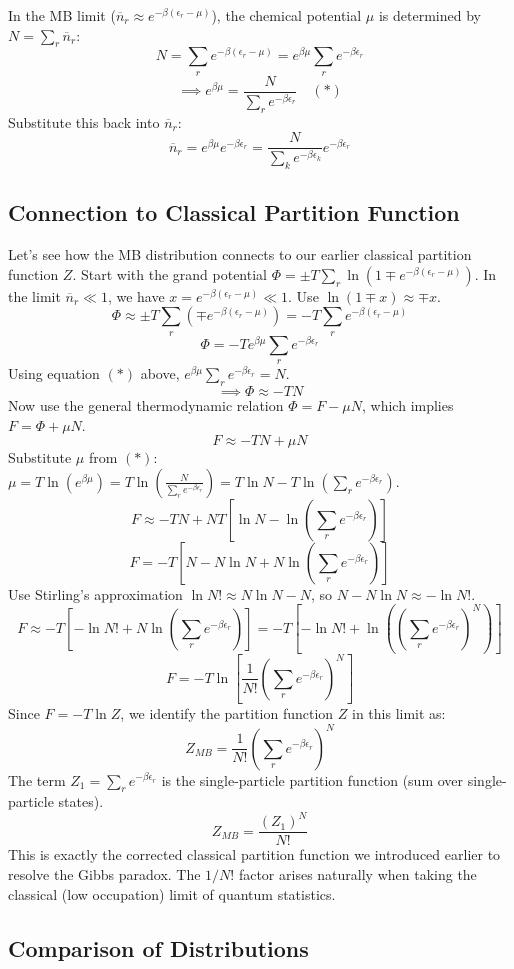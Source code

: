 \documentclass[11pt]{article}
\newcommand{\eps}{\epsilon}
\newcommand{\nbar}{\overline{n}} %
\begin{document}
In the MB limit ($\nbar_r \approx e^{-\beta(\eps_r-\mu)}$), the chemical potential $\mu$ is determined by $N = \sum_r \nbar_r$:
\[ N = \sum_r e^{-\beta(\eps_r-\mu)} = e^{\beta\mu} \sum_r e^{-\beta\eps_r} \]
\[ \implies e^{\beta\mu} = \frac{N}{\sum_r e^{-\beta\eps_r}} \quad (*) \]
Substitute this back into $\nbar_r$:
\[ \nbar_r = e^{\beta\mu} e^{-\beta\eps_r} = \frac{N}{\sum_k e^{-\beta\eps_k}} e^{-\beta\eps_r} \]

\subsection*{Connection to Classical Partition Function}

Let's see how the MB distribution connects to our earlier classical partition function $Z$.
Start with the grand potential $\Phi = \pm T \sum_r \ln(1 \mp e^{-\beta(\eps_r-\mu)})$.
In the limit $\nbar_r \ll 1$, we have $x = e^{-\beta(\eps_r-\mu)} \ll 1$. Use $\ln(1 \mp x) \approx \mp x$.
\[ \Phi \approx \pm T \sum_r (\mp e^{-\beta(\eps_r-\mu)}) = -T \sum_r e^{-\beta(\eps_r-\mu)} \]
\[ \Phi = -T e^{\beta\mu} \sum_r e^{-\beta\eps_r} \]
Using equation $(*)$ above, $e^{\beta\mu} \sum_r e^{-\beta\eps_r} = N$.
\[ \implies \Phi \approx -TN \]
Now use the general thermodynamic relation $\Phi = F - \mu N$, which implies $F = \Phi + \mu N$.
\[ F \approx -TN + \mu N \]
Substitute $\mu$ from $(*)$: $\mu = T \ln(e^{\beta\mu}) = T \ln\left( \frac{N}{\sum_r e^{-\beta\eps_r}} \right) = T \ln N - T \ln(\sum_r e^{-\beta\eps_r})$.
\[ F \approx -TN + N T [\ln N - \ln(\sum_r e^{-\beta\eps_r})] \]
\[ F = -T [N - N \ln N + N \ln(\sum_r e^{-\beta\eps_r})] \]
Use Stirling's approximation $\ln N! \approx N \ln N - N$, so $N - N \ln N \approx -\ln N!$.
\[ F \approx -T [-\ln N! + N \ln(\sum_r e^{-\beta\eps_r})] = -T [-\ln N! + \ln((\sum_r e^{-\beta\eps_r})^N)] \]
\[ F = -T \ln \left[ \frac{1}{N!} \left( \sum_r e^{-\beta\eps_r} \right)^N \right] \]
Since $F = -T \ln Z$, we identify the partition function $Z$ in this limit as:
\[ Z_{MB} = \frac{1}{N!} \left( \sum_r e^{-\beta\eps_r} \right)^N \]
The term $Z_1 = \sum_r e^{-\beta\eps_r}$ is the single-particle partition function (sum over single-particle states).
\[ Z_{MB} = \frac{(Z_1)^N}{N!} \]
This is exactly the corrected classical partition function we introduced earlier to resolve the Gibbs paradox. The $1/N!$ factor arises naturally when taking the classical (low occupation) limit of quantum statistics.

\subsection*{Comparison of Distributions}
\end{document}
